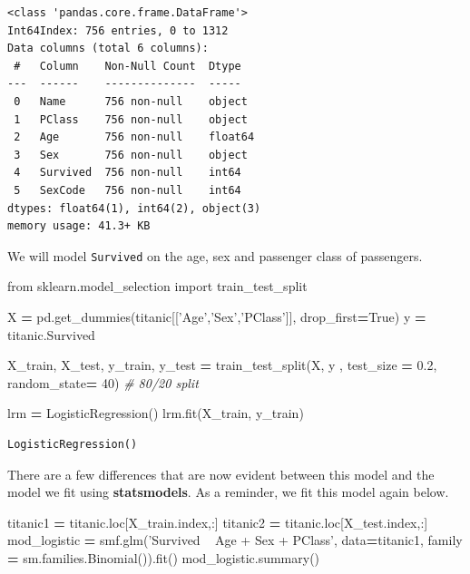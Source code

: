 \documentclass[
  letterpaper,
]{scrbook}
\newenvironment{Shaded}{\begin{snugshade}}{\end{snugshade}}
\newcommand{\CommentTok}[1]{\textcolor[rgb]{0.56,0.35,0.01}{\textit{#1}}}
\newcommand{\DecValTok}[1]{\textcolor[rgb]{0.00,0.00,0.81}{#1}}
\newcommand{\FloatTok}[1]{\textcolor[rgb]{0.00,0.00,0.81}{#1}}
\newcommand{\ImportTok}[1]{#1}
\newcommand{\NormalTok}[1]{#1}
\newcommand{\OperatorTok}[1]{\textcolor[rgb]{0.81,0.36,0.00}{\textbf{#1}}}
\newcommand{\StringTok}[1]{\textcolor[rgb]{0.31,0.60,0.02}{#1}}
\newcommand{\VariableTok}[1]{\textcolor[rgb]{0.00,0.00,0.00}{#1}}
\begin{document}
\begin{verbatim}
<class 'pandas.core.frame.DataFrame'>
Int64Index: 756 entries, 0 to 1312
Data columns (total 6 columns):
 #   Column    Non-Null Count  Dtype  
---  ------    --------------  -----  
 0   Name      756 non-null    object 
 1   PClass    756 non-null    object 
 2   Age       756 non-null    float64
 3   Sex       756 non-null    object 
 4   Survived  756 non-null    int64  
 5   SexCode   756 non-null    int64  
dtypes: float64(1), int64(2), object(3)
memory usage: 41.3+ KB
\end{verbatim}

We will model \texttt{Survived} on the age, sex and passenger class of passengers.

\begin{Shaded}
\begin{Highlighting}[]
\ImportTok{from}\NormalTok{ sklearn.model_selection }\ImportTok{import}\NormalTok{ train_test_split}

\NormalTok{X }\OperatorTok{=}\NormalTok{ pd.get_dummies(titanic[[}\StringTok{'Age'}\NormalTok{,}\StringTok{'Sex'}\NormalTok{,}\StringTok{'PClass'}\NormalTok{]], drop_first}\OperatorTok{=}\VariableTok{True}\NormalTok{)}
\NormalTok{y }\OperatorTok{=}\NormalTok{ titanic.Survived}

\NormalTok{X_train, X_test, y_train, y_test }\OperatorTok{=}\NormalTok{ train_test_split(X, y , test_size }\OperatorTok{=} \FloatTok{0.2}\NormalTok{, random_state}\OperatorTok{=} \DecValTok{40}\NormalTok{) }\CommentTok{# 80/20 split}

\NormalTok{lrm }\OperatorTok{=}\NormalTok{ LogisticRegression()}
\NormalTok{lrm.fit(X_train, y_train)}
\end{Highlighting}
\end{Shaded}

\begin{verbatim}
LogisticRegression()
\end{verbatim}

There are a few differences that are now evident between this model and
the model we fit using \textbf{statsmodels}. As a reminder, we fit this model again below.

\begin{Shaded}
\begin{Highlighting}[]
\NormalTok{titanic1 }\OperatorTok{=}\NormalTok{ titanic.loc[X_train.index,:]}
\NormalTok{titanic2 }\OperatorTok{=}\NormalTok{ titanic.loc[X_test.index,:]}
\NormalTok{mod_logistic }\OperatorTok{=}\NormalTok{ smf.glm(}\StringTok{'Survived ~ Age + Sex + PClass'}\NormalTok{, data}\OperatorTok{=}\NormalTok{titanic1,}
\NormalTok{  family }\OperatorTok{=}\NormalTok{ sm.families.Binomial()).fit()}
\NormalTok{mod_logistic.summary()}
\end{Highlighting}
\end{Shaded}
\end{document}
